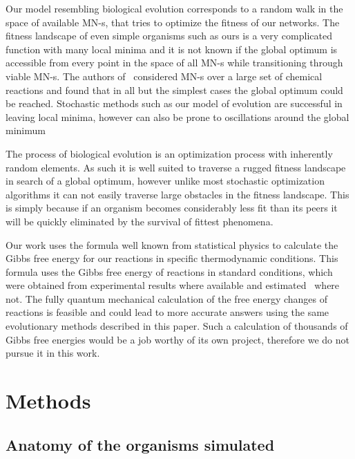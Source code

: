 \documentclass[a4paper,12pt]{article}
\begin{document}
	Our model resembling biological evolution corresponds to a random walk in the space of available MN-s, that tries to optimize the fitness of our networks. The fitness landscape of even simple organisms such as ours is a very complicated function with many local minima and it is not known if the global optimum is accessible from every point in the space of all MN-s while transitioning through viable MN-s. The authors of \cite{historical}~considered MN-s over a large set of chemical reactions and found that in all but the simplest cases the global optimum could be reached. Stochastic methods such as our model of evolution are successful in leaving local minima, however can also be prone to oscillations around the global minimum 

	The process of biological evolution is an optimization process with inherently random elements. As such it is well suited to traverse a rugged fitness landscape in search of a global optimum, however unlike most stochastic optimization algorithms it can not easily traverse large obstacles in the fitness landscape. This is simply because if an organism becomes considerably less fit than its peers it will be quickly eliminated by the survival of fittest phenomena.

	Our work uses the formula well known from statistical physics to calculate the Gibbs free energy for our reactions in specific thermodynamic conditions. This formula uses the Gibbs free energy of reactions in standard conditions, which were obtained from experimental results where available and estimated \cite{BartekLower}~where not. The fully quantum mechanical calculation of the free energy changes of reactions is feasible and could lead to more accurate answers using the same evolutionary methods described in this paper. Such a calculation of thousands of Gibbs free energies would be a job worthy of its own project, therefore we do not pursue it in this work. 

	
\section{Methods}
\label{sec:methods}



	\subsection{Anatomy of the organisms simulated}
	\label{ssub:anatomy_of_the_oganisms_simulated}
\end{document}
